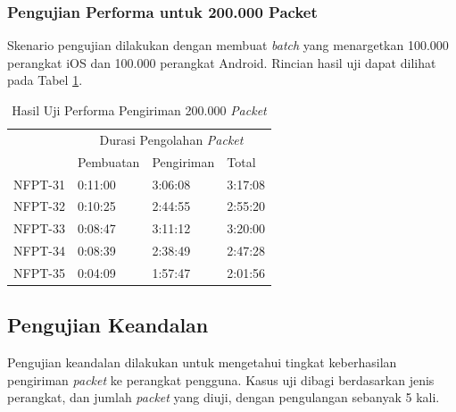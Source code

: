 \subsubsection{Pengujian Performa untuk 200.000 Packet}
\par Skenario pengujian dilakukan dengan membuat \textit{batch} yang menargetkan 100.000 perangkat iOS dan 100.000 perangkat Android. Rincian hasil uji dapat dilihat pada Tabel \ref{t:performa-200k}.

\begin{longtable}{|p{1.5cm}|p{2cm}|p{2cm}|p{2cm}|}
\caption{Hasil Uji Performa Pengiriman 200.000 \textit{Packet}} \label{t:performa-200k} \\ \hline
\rowcolor{lightgray} & \multicolumn{3}{c|}{Durasi Pengolahan \textit{Packet}} \\ \hhline{~|*3{-}|}
\rowcolor{lightgray} \multirow{-2}{*}{Kode} & Pembuatan & Pengiriman & Total \\ \hline
\endhead
	NFPT-31 & 0:11:00 & 3:06:08 & 3:17:08 \\ \hline 
	NFPT-32 & 0:10:25 & 2:44:55 & 2:55:20 \\ \hline
	NFPT-33 & 0:08:47 & 3:11:12 & 3:20:00 \\ \hline
	NFPT-34 & 0:08:39 & 2:38:49 & 2:47:28 \\ \hline
	NFPT-35 & 0:04:09 & 1:57:47 & 2:01:56 \\ \hline
\end{longtable}

\subsection{Pengujian Keandalan}
\par Pengujian keandalan dilakukan untuk mengetahui tingkat keberhasilan pengiriman \textit{packet} ke perangkat pengguna. Kasus uji dibagi berdasarkan jenis perangkat, dan jumlah \textit{packet} yang diuji, dengan pengulangan sebanyak 5 kali.


